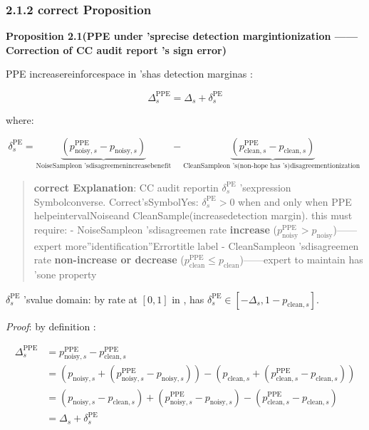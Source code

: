 \documentclass[
  12pt,
]{article}
\begin{document}
\subsubsection{2.1.2 correct Proposition}\label{ux4feeux6b63ux547dux9898}

\textbf{Proposition 2.1(PPE under 'sprecise detection margintionization ------Correction of CC audit report 's
sign error)}

PPE increasereinforcespace in 'shas detection marginas : 

\[\boxed{\Delta_s^{\text{PPE}} = \Delta_s + \delta_s^{\text{PE}}}\]

where: 

\[\boxed{\delta_s^{\text{PE}} = \underbrace{(p_{\text{noisy}, s}^{\text{PPE}} - p_{\text{noisy}, s})}_{\text{NoiseSampleon 'sdisagreemenincreasebenefit}} - \underbrace{(p_{\text{clean}, s}^{\text{PPE}} - p_{\text{clean}, s})}_{\text{CleanSampleon 's(non-hope has 's)disagreementionization }}}\]

\begin{quote}
\textbf{correct Explanation}: CC audit reportin  \(\delta_s^{\text{PE}}\)
'sexpression Symbolconverse. Correct'sSymbolYes: \(\delta_s^{\text{PE}} > 0\) when and only when 
PPE helpeintervalNoiseand CleanSample(increasedetection margin). this must require:  -
NoiseSampleon 'sdisagreemen rate \textbf{increase }(\(p_{\text{noisy}}^{\text{PPE}} > p_{\text{noisy}}\))------expert more''identification''Errortitle label
-
CleanSampleon 'sdisagreemen rate \textbf{non-increase or decrease }(\(p_{\text{clean}}^{\text{PPE}} \leq p_{\text{clean}}\))------expert to maintain has 'sone property 
\end{quote}

\(\delta_s^{\text{PE}}\) 'svalue domain: by rate at  \([0,1]\) in , has 
\(\delta_s^{\text{PE}} \in [-\Delta_s, 1 - p_{\text{clean}, s}]\). 

\emph{Proof}: by definition : 

\begin{align*}
\Delta_s^{\text{PPE}} &= p_{\text{noisy}, s}^{\text{PPE}} - p_{\text{clean}, s}^{\text{PPE}} \\
&= (p_{\text{noisy}, s} + (p_{\text{noisy}, s}^{\text{PPE}} - p_{\text{noisy}, s})) - (p_{\text{clean}, s} + (p_{\text{clean}, s}^{\text{PPE}} - p_{\text{clean}, s})) \\
&= (p_{\text{noisy}, s} - p_{\text{clean}, s}) + (p_{\text{noisy}, s}^{\text{PPE}} - p_{\text{noisy}, s}) - (p_{\text{clean}, s}^{\text{PPE}} - p_{\text{clean}, s}) \\
&= \Delta_s + \delta_s^{\text{PE}}
\end{align*}
\end{document}
